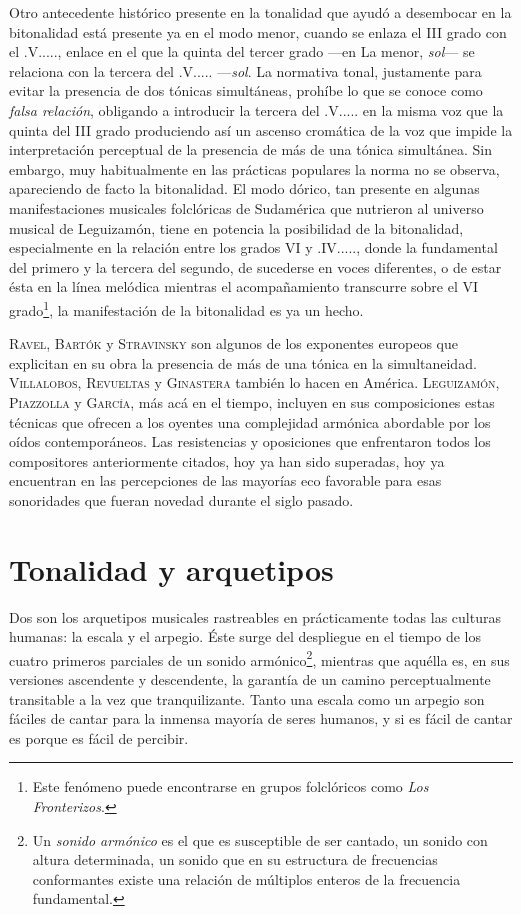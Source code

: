 Otro antecedente histórico presente en la tonalidad que ayudó a desembocar en la bitonalidad está presente ya en el modo menor, cuando se enlaza el III grado con el \acorde.V....., enlace en el que la quinta del tercer grado ---en La menor, \emph{sol}--- se relaciona con la tercera del \acorde.V..... ---\emph{sol\sostenidotxt}. La normativa tonal, justamente para evitar la presencia de dos tónicas simultáneas, prohíbe lo que se conoce como \emph{falsa relación}, obligando a introducir la tercera del \acorde.V..... en la misma voz que la quinta del III grado produciendo así un ascenso cromática de la voz que impide la interpretación perceptual de la presencia de más de una tónica simultánea. Sin embargo, muy habitualmente en las prácticas populares la norma no se observa, apareciendo de facto la bitonalidad. El modo dórico, tan presente en algunas manifestaciones musicales folclóricas de Sudamérica que nutrieron al universo musical de Leguizamón, tiene en potencia la posibilidad de la bitonalidad, especialmente en la relación entre los grados VI y \acorde.IV....., donde la fundamental del primero y la tercera del segundo, de sucederse en voces diferentes, o de estar ésta en la línea melódica mientras el acompañamiento transcurre sobre el VI grado\footnote{Este fenómeno puede encontrarse en grupos folclóricos como \emph{Los Fronterizos}.}, la manifestación de la bitonalidad es ya un hecho.

\textsc{Ravel}, \textsc{Bartók} y \textsc{Stravinsky} son algunos de los exponentes europeos que explicitan en su obra la presencia de más de una tónica en la simultaneidad. \textsc{Villalobos}, \textsc{Revueltas} y \textsc{Ginastera} también lo hacen en América. \textsc{Leguizamón}, \textsc{Piazzolla} y \textsc{García}, más acá en el tiempo, incluyen en sus composiciones estas técnicas que ofrecen a los oyentes una complejidad armónica abordable por los oídos contemporáneos. Las resistencias y oposiciones que enfrentaron todos los compositores anteriormente citados, hoy ya han sido superadas, hoy ya encuentran en las percepciones de las mayorías eco favorable para esas sonoridades que fueran novedad durante el siglo pasado.

\section{Tonalidad y arquetipos}
\label{sec:tonalidad-arquetipos}

Dos son los arquetipos musicales rastreables en prácticamente todas las culturas humanas: la escala y el arpegio. Éste surge del despliegue en el tiempo de los cuatro primeros parciales de un sonido armónico\footnote{Un \emph{sonido armónico} es el que es susceptible de ser cantado, un sonido con altura determinada, un sonido que en su estructura de frecuencias conformantes existe una relación de múltiplos enteros de la frecuencia fundamental.}, mientras que aquélla es, en sus versiones ascendente y descendente, la garantía de un camino perceptualmente transitable a la vez que tranquilizante. Tanto una escala como un arpegio son fáciles de cantar para la inmensa mayoría de seres humanos, y si es fácil de cantar es porque es fácil de percibir.

